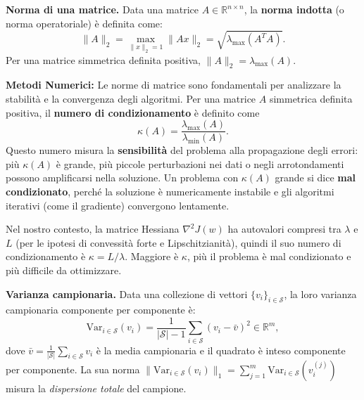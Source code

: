 \documentclass[a4paper,12pt]{article}
\numberwithin{equation}{section}
\numberwithin{figure}{section}
\numberwithin{table}{section}
\newcommand{\R}{\mathbb{R}}
\newcommand{\Var}{\mathrm{Var}}
\begin{document}
\begin{definitionbox}
  \textbf{Norma di una matrice.} Data una matrice $A \in \R^{n \times n}$, la \textbf{norma indotta} (o norma operatoriale) è definita come:
  \[
    \|A\|_2 = \max_{\|x\|_2=1} \|Ax\|_2 = \sqrt{\lambda_{\max}(A^T A)}.
  \]
  Per una matrice simmetrica definita positiva, $\|A\|_2 = \lambda_{\max}(A)$.
  
 \begin{mnbox}
  \textbf{Metodi Numerici:} Le norme di matrice sono fondamentali per analizzare la stabilità e la convergenza degli algoritmi. Per una matrice $A$ simmetrica definita positiva, il \textbf{numero di condizionamento} è definito come
  \[
  \kappa(A) = \frac{\lambda_{\max}(A)}{\lambda_{\min}(A)}.
  \]
  Questo numero misura la \textbf{sensibilità} del problema alla propagazione degli errori: più $\kappa(A)$ è grande, più piccole perturbazioni nei dati o negli arrotondamenti possono amplificarsi nella soluzione. Un problema con $\kappa(A)$ grande si dice \textbf{mal condizionato}, perché la soluzione è numericamente instabile e gli algoritmi iterativi (come il gradiente) convergono lentamente.

  Nel nostro contesto, la matrice Hessiana $\nabla^2 J(w)$ ha autovalori compresi tra $\lambda$ e $L$ (per le ipotesi di convessità forte e Lipschitzianità), quindi il suo numero di condizionamento è $\kappa = L/\lambda$. Maggiore è $\kappa$, più il problema è mal condizionato e più difficile da ottimizzare.
\end{mnbox}
\end{definitionbox}

\begin{definitionbox}
  \textbf{Varianza campionaria.} Data una collezione di vettori $\{v_i\}_{i \in \mathcal{S}}$, la loro varianza campionaria componente per componente \`e:
  \[
    \Var_{i \in \mathcal{S}}(v_i) = \frac{1}{|\mathcal{S}|-1} \sum_{i \in \mathcal{S}} \left(v_i - \bar{v}\right)^2 \in \R^m,
  \]
  dove $\bar{v} = \frac{1}{|\mathcal{S}|}\sum_{i \in \mathcal{S}} v_i$ \`e la media campionaria e il quadrato \`e inteso componente per componente. La sua norma $\|\Var_{i \in \mathcal{S}}(v_i)\|_1 = \sum_{j=1}^m \Var_{i \in \mathcal{S}}(v_i^{(j)})$ misura la \emph{dispersione totale} del campione.
\end{definitionbox}
\end{document}
